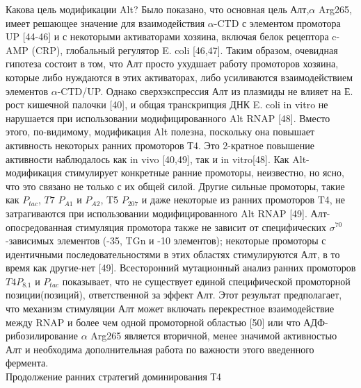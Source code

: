 \documentclass[a4paper,12pt]{article}
\begin{document}
            \par{Какова цель модификации Alt? Было показано, что основная цель Алт,\(\alpha\) Arg265, имеет решающее
            значение для взаимодействия \(\alpha\)-CTD с элементом промотора UP [44-46] и с некоторыми активаторами
            хозяина, включая белок рецептора c-AMP (CRP), глобальный регулятор E. coli [46,47]. Таким образом, очевидная
            гипотеза состоит в том, что Алт просто ухудшает работу промоторов хозяина, которые либо нуждаются в этих
            активаторах, либо усиливаются взаимодействием элементов \(\alpha\)-CTD/UP. Однако сверхэкспрессия Алт из
            плазмиды не влияет на Е. рост кишечной палочки [40], и общая транскрипция ДНК E. coli in vitro не нарушается
            при использовании модифицированного Alt RNAP [48]. Вместо этого, по-видимому, модификация Alt полезна,
            поскольку она повышает активность некоторых ранних промоторов Т4. Это 2-кратное повышение активности
            наблюдалось как in vivo [40,49], так и in vitro[48]. Как Alt-модификация стимулирует конкретные ранние
            промоторы, неизвестно, но ясно, что это связано не только с их общей силой. Другие сильные промоторы, такие
            как \(P_{tac}\), \(T7\) \(P_{A1}\) и \(P_{A2}\), T5 \(P_{207}\) и даже некоторые из ранних промоторов T4, не
            затрагиваются при использовании модифицированного Alt RNAP [49]. Алт-опосредованная стимуляция промотора
            также не зависит от специфических \(\sigma^{70}\)-зависимых элементов (-35, TGn и -10 элементов); некоторые
            промоторы с идентичными последовательностями в этих областях стимулируются Алт, в то время как другие-нет
            [49]. Всесторонний мутационный анализ ранних промоторов \(T4 P_{8.1}\) и \(P_{tac}\) показывает, что не
            существует единой специфической промоторной позиции(позиций), ответственной за эффект Алт. Этот результат
            предполагает, что механизм стимуляции Алт может включать перекрестное взаимодействие между RNAP и более чем
            одной промоторной областью [50] или что АДФ-рибозилирование $ \alpha $ Arg265 является вторичной, менее
            значимой активностью Алт и необходима дополнительная работа по важности этого введенного фермента.}\\
        {\Large Продолжение ранних стратегий доминирования Т4}
\end{document}
